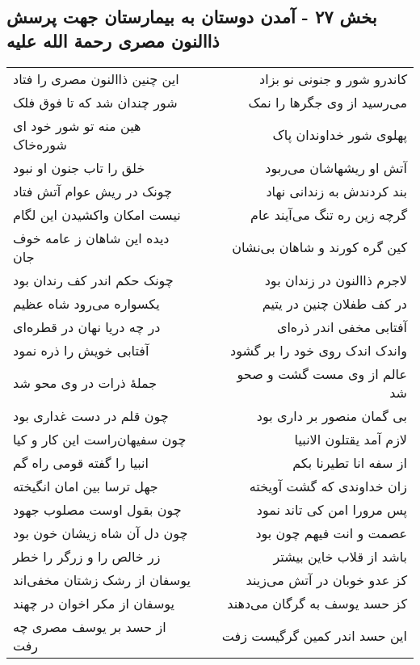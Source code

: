 \begin{center}
\section*{بخش ۲۷ - آمدن دوستان به بیمارستان جهت پرسش ذاالنون مصری رحمة الله علیه}
\label{sec:sh027}
\begin{longtable}{l p{0.5cm} r}
این چنین ذاالنون مصری را فتاد
&&
کاندرو شور و جنونی نو بزاد
\\
شور چندان شد که تا فوق فلک
&&
می‌رسید از وی جگرها را نمک
\\
هین منه تو شور خود ای شوره‌خاک
&&
پهلوی شور خداوندان پاک
\\
خلق را تاب جنون او نبود
&&
آتش او ریشهاشان می‌ربود
\\
چونک در ریش عوام آتش فتاد
&&
بند کردندش به زندانی نهاد
\\
نیست امکان واکشیدن این لگام
&&
گرچه زین ره تنگ می‌آیند عام
\\
دیده این شاهان ز عامه خوف جان
&&
کین گره کورند و شاهان بی‌نشان
\\
چونک حکم اندر کف رندان بود
&&
لاجرم ذاالنون در زندان بود
\\
یکسواره می‌رود شاه عظیم
&&
در کف طفلان چنین در یتیم
\\
در چه دریا نهان در قطره‌ای
&&
آفتابی مخفی اندر ذره‌ای
\\
آفتابی خویش را ذره نمود
&&
واندک اندک روی خود را بر گشود
\\
جملهٔ ذرات در وی محو شد
&&
عالم از وی مست گشت و صحو شد
\\
چون قلم در دست غداری بود
&&
بی گمان منصور بر داری بود
\\
چون سفیهان‌راست این کار و کیا
&&
لازم آمد یقتلون الانبیا
\\
انبیا را گفته قومی راه گم
&&
از سفه انا تطیرنا بکم
\\
جهل ترسا بین امان انگیخته
&&
زان خداوندی که گشت آویخته
\\
چون بقول اوست مصلوب جهود
&&
پس مرورا امن کی تاند نمود
\\
چون دل آن شاه زیشان خون بود
&&
عصمت و انت فیهم چون بود
\\
زر خالص را و زرگر را خطر
&&
باشد از قلاب خاین بیشتر
\\
یوسفان از رشک زشتان مخفی‌اند
&&
کز عدو خوبان در آتش می‌زیند
\\
یوسفان از مکر اخوان در چهند
&&
کز حسد یوسف به گرگان می‌دهند
\\
از حسد بر یوسف مصری چه رفت
&&
این حسد اندر کمین گرگیست زفت
\\

\end{longtable}
\end{center}
